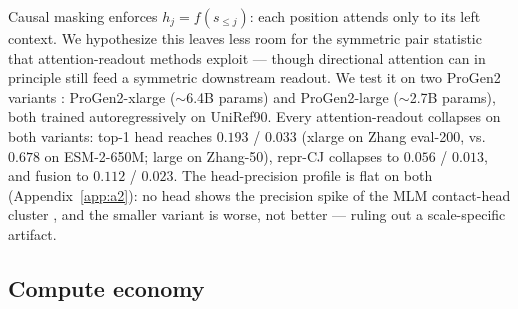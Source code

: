 \documentclass{article}
\begin{document}
Causal masking enforces $h_j = f(s_{\leq j})$: each position attends
only to its left context. We hypothesize this leaves less room for the
symmetric pair statistic that attention-readout methods exploit ---
though directional attention can in principle still feed a symmetric
downstream readout. We test it on two
ProGen2 variants \citep{madani2023progen2}: ProGen2-xlarge ($\sim$6.4B
params) and ProGen2-large ($\sim$2.7B params), both trained
autoregressively on UniRef90. Every attention-readout
collapses on both variants: top-1 head reaches $0.193$ / $0.033$
(xlarge on Zhang eval-200, vs.\ $0.678$ on ESM-2-650M; large on Zhang-50),
repr-CJ collapses to $0.056$ / $0.013$, and fusion to $0.112$ / $0.023$. The head-precision profile is flat on both
(Appendix~\ref{app:a2}): no head shows the precision spike of the MLM
contact-head cluster \citep{bhattacharya2021attention}, and the
smaller variant is worse, not better --- ruling out a
scale-specific artifact.

\subsection{Compute economy}
\label{sec:cost}
\end{document}
